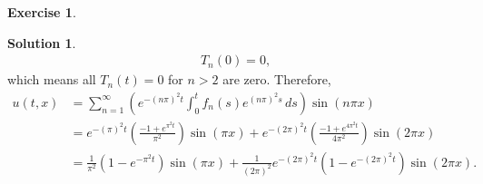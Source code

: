 \documentclass{book}
\theoremstyle{definition}
\newtheorem*{exer*}{Exercise}
\newtheorem*{sln*}{Solution}
\begin{document}
\begin{exer*}
\begin{sln*}
\begin{align*}
		T_n(0) = 0,
		\end{align*}
		which means all $T_n(t) = 0$ for $n>2$ are zero. Therefore, 
		\begin{align*}
		u(t,x) &= \sum^\infty_{n=1}\left( e^{-(n\pi)^2t}\int^t_0 f_n(s)e^{(n\pi)^2s}\,ds \right)\sin(n\pi x)\\
		&= e^{-(\pi)^2t}\left(\frac{-1 + e^{\pi^2t}}{\pi^2}\right)\sin(\pi x) + e^{-(2\pi)^2t}\left(\frac{-1 + e^{4\pi^2t}}{4\pi^2} \right)\sin(2\pi x)\\
		&= \frac{1}{\pi^2}\left(1 - e^{-\pi^2 t}\right)\sin(\pi x) + \frac{1}{(2\pi)^2}e^{-(2\pi)^2t}\left(1 - e^{-(2\pi)^2t}\right)\sin(2\pi x).
		\end{align*}
		
		
	\end{sln*}
\end{exer*}

\newpage
\end{document}
